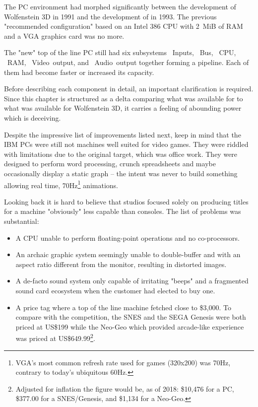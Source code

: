 The PC environment had morphed significantly between the development of Wolfenstein 3D in 1991 and the development of \doom{} in 1993. The previous "recommended configuration" based on an Intel 386 CPU with 2~MiB of RAM and a VGA graphics card was no more.\\
\par
The "new" top of the line PC still had six subsystems ~Inputs, ~Bus, ~CPU, ~RAM, ~Video~output, and ~Audio~output together forming a pipeline. Each of them had become faster or increased its capacity.\\
\par
\vspace{2mm}
\par
 Before describing each component in detail, an important clarification is required. Since this chapter is structured as a delta comparing what was available for \doom{} to what was available for Wolfenstein 3D, it carries a feeling of abounding power which is deceiving. \\
 \par
 Despite the impressive list of improvements listed next, keep in mind that the IBM PCs were still not machines well suited for video games. They were riddled with limitations due to the original target, which was office work. They were designed to perform word processing, crunch spreadsheets and maybe occasionally display a static graph -- the intent was never to build something allowing real time, 70Hz\footnote{VGA's most common refresh rate used for games (320x200) was 70Hz, contrary to today's ubiquitous 60Hz.} animations.\\ 
\par 
Looking back it is hard to believe that studios focused solely on producing titles for a machine "obviously" less capable than consoles. The list of problems was substantial:
\begin{itemize}
\item A CPU unable to perform floating-point operations and no co-processors.
\item An archaic graphic system seemingly unable to double-buffer and with an aspect ratio different from the monitor, resulting in distorted images.
\item A de-facto sound system only capable of irritating "beeps" and a fragmented sound card ecosystem when the customer had elected to buy one.
\item A price tag where a top of the line machine fetched close to \$3,000. To compare with the competition, the SNES and the SEGA Genesis were both priced at US\$199 while the Neo-Geo which provided arcade-like experience was priced at US\$649.99\footnote{Adjusted for inflation the figure would be, as of 2018: \$10,476 for a PC, \$377.00 for a SNES/Genesis, and \$1,134 for a Neo-Geo.}.
\end{itemize}
